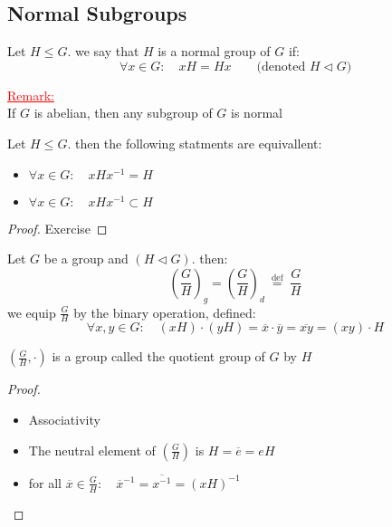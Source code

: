 \subsection{Normal Subgroups}
\begin{definition}[]
Let $H \leq G $. we say that $H $ is a normal group of $G $ if: 
\[
\forall x \in   G: \quad xH = Hx 
\quad \quad \text{(denoted $H \lhd G $)}  
\]
\end{definition}
\noindent
\textcolor{red}{
\underline{
Remark:
}
}\\
If $G $ is abelian, then any subgroup of $G $ is normal
\begin{proposition}[]
Let $H \leq G $. then the following statments are equivallent:
\begin{itemize}
  \item[\ding{172}] $\forall x \in   G: \quad x H x^{-1} = H $ 
  \item[\ding{173}] $\forall x \in  G: \quad x H x^{-1} \subset H $ 
\end{itemize}
\end{proposition}
\begin{proof}
Exercise
\end{proof}
Let $G $ be a group and $(H \lhd  G)$. then:
\[
\left( \frac{G}{H} \right) _{g} = \left( \frac{G}{H} \right) _{d} \overset{\text{ def }  }{=} 
\frac{G}{H}
\]
we equip $\frac{G}{H} $ by the binary operation, defined:
\[
\forall x,y \in   G: \quad (xH) \cdot  (yH) = \overline{x}\cdot \overline{y}= \overline{xy}=
\left( xy \right) \cdot H
\]
\begin{theorem}[]
$\left( \frac{G}{H}, \cdot  \right)  $ is a group called the quotient group of $G $ by 
$H $ 
\end{theorem}
\begin{proof}
  \begin{itemize}
    \item[\ding{49}] Associativity
    \item[\ding{49}] The neutral element of $\left( \frac{G}{H} \right)$ is $H = \overline{e} = e H $ 
    \item[\ding{49}] for all $\overline{x}\in   \frac{G}{H}: \quad \overline{x}^{-1}= \overline{x^{-1}}= 
      \left( x H \right) ^{-1}$ 
  \end{itemize}
\end{proof}
